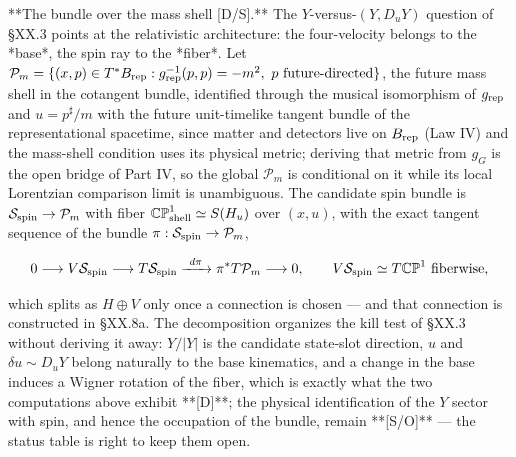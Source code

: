 **The bundle over the mass shell [D/S].** The $Y$-versus-$(Y,D_uY)$ question of §XX.3 points at the relativistic architecture: the four-velocity belongs to the *base*, the spin ray to the *fiber*. Let $\mathcal P_m = \{(x,p)\in T^*B_{\rm rep}: g_{\rm rep}^{-1}(p,p) = -m^2,\ p\ \text{future-directed}\}$, the future mass shell in the cotangent bundle, identified through the musical isomorphism of $g_{\rm rep}$ and $u = p^\sharp/m$ with the future unit-timelike tangent bundle of the representational spacetime, since matter and detectors live on $B_{\rm rep}$ (Law IV) and the mass-shell condition uses its physical metric; deriving that metric from $g_G$ is the open bridge of Part IV, so the global $\mathcal P_m$ is conditional on it while its local Lorentzian comparison limit is unambiguous. The candidate spin bundle is $\mathcal S_{\rm spin}\to\mathcal P_m$ with fiber $\mathbb{CP}^1_{\rm shell}\simeq S(H_u)$ over $(x,u)$, with the exact tangent sequence of the bundle $\pi:\mathcal S_{\rm spin}\to\mathcal P_m$,

$$0\longrightarrow V\mathcal S_{\rm spin}\longrightarrow T\mathcal S_{\rm spin}\xrightarrow{\ d\pi\ }\pi^*T\mathcal P_m\longrightarrow0,\qquad V\mathcal S_{\rm spin}\simeq T\mathbb{CP}^1\ \text{fiberwise},$$

which splits as $H\oplus V$ only once a connection is chosen — and that connection is constructed in §XX.8a. The decomposition organizes the kill test of §XX.3 without deriving it away: $Y/|Y|$ is the candidate state-slot direction, $u$ and $\delta u\sim D_uY$ belong naturally to the base kinematics, and a change in the base induces a Wigner rotation of the fiber, which is exactly what the two computations above exhibit **[D]**; the physical identification of the $Y$ sector with spin, and hence the occupation of the bundle, remain **[S/O]** — the status table is right to keep them open.

